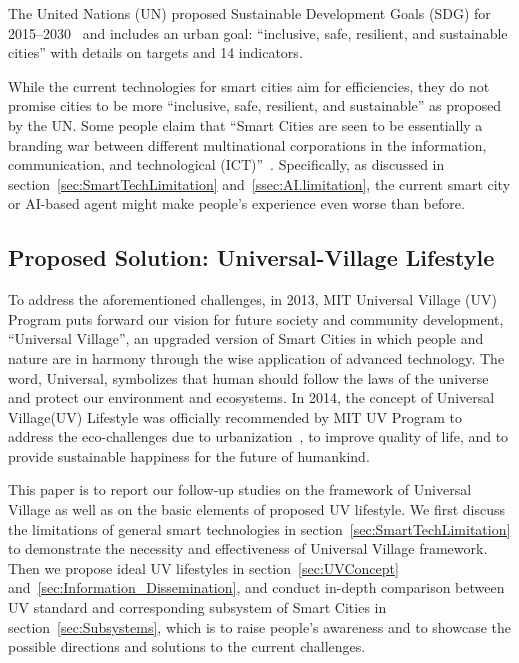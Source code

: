 \documentclass[letterpaper, twocolumn, 10pt, conference]{IEEEtran}
\begin{document}
The United Nations (UN) proposed Sustainable Development Goals (SDG) for 2015–2030~\cite{ UN-sustainable-development} and includes an urban goal: \enquote{inclusive, safe, resilient, and sustainable cities} with details on targets and 14 indicators.

While the current technologies for smart cities aim for efficiencies, they do not promise cities to be more \enquote{inclusive, safe, resilient, and sustainable} as proposed by the UN. Some people claim that \enquote{Smart Cities are seen to be essentially a branding war between different multinational corporations in the information, communication, and technological (ICT)}~\cite{allam2018redefining}.  Specifically, as discussed in section~\ref{sec:SmartTechLimitation} and~\ref{ssec:AI.limitation}, the current smart city or AI-based agent might make people’s experience even worse than before. 

\subsection{Proposed Solution: Universal-Village Lifestyle}
\label{ssec:UV.solution}

To address the aforementioned challenges, in 2013, MIT Universal Village (UV) Program puts forward our vision for future society and community development, \enquote{Universal Village}, an upgraded version of Smart Cities in which people and nature are in harmony through the wise application of advanced technology. 
The word, Universal, symbolizes that human should follow the laws of the universe and protect our environment and ecosystems. In 2014, the concept of Universal Village(UV) Lifestyle was officially recommended by MIT UV Program to address the eco-challenges due to urbanization~\cite{mit-uv2014}, to improve quality of life, and to provide sustainable happiness for the future of humankind. 

This paper is to report our follow-up studies on the framework of Universal Village as well as on the basic elements of proposed UV lifestyle. We first discuss the limitations of general smart technologies in section~\ref{sec:SmartTechLimitation} to demonstrate the necessity and effectiveness of Universal Village framework. 
Then we propose ideal UV lifestyles in section~\ref{sec:UVConcept} and~\ref{sec:Information_Dissemination}, and conduct in-depth comparison between UV standard and corresponding subsystem of Smart Cities in section~\ref{sec:Subsystems}, which is to raise people’s awareness and to showcase the possible directions and solutions to the current challenges. 
\end{document}
